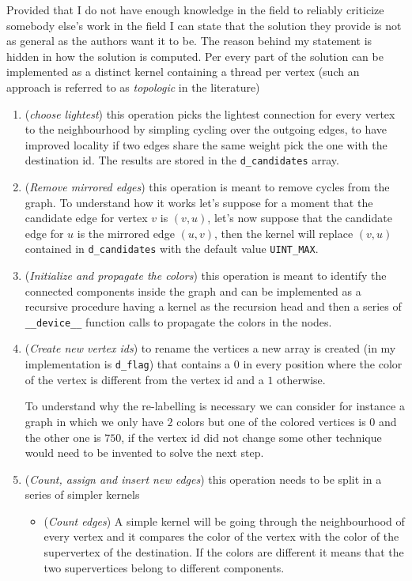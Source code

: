 \documentclass[a4paper,10pt]{article}
\begin{document}
Provided that I do not have enough knowledge in the field to reliably criticize somebody else's work
in the field I can state that the solution they provide is not as general as the authors want it to
be. The reason behind my statement is hidden in how the solution is computed. Per
\cite{generic-he-boruvka} every part of the solution can be implemented as a distinct kernel
containing a thread per vertex (such an approach is referred to as \textit{topologic} in the
literature)
\begin{enumerate}
	\item\label{item:choose-lightest} (\textit{choose lightest}) this operation picks the
		lightest connection for every vertex to the neighbourhood by simpling cycling over
		the outgoing edges, to have improved locality if two edges share the same weight pick the one with the destination id. The results are stored in the \texttt{d\_candidates} array.
	\item\label{item:mirror-removal} (\textit{Remove mirrored edges}) this operation is meant to
		remove cycles from the graph. To understand how it works let's suppose for a moment
		that the candidate edge for vertex $v$ is $(v, u)$, let's now suppose that the
		candidate edge for $u$ is the mirrored edge $(u, v)$, then the kernel will replace
		$(v, u)$ contained in \texttt{d\_candidates} with the default value
		\texttt{UINT\_MAX}.
	\item\label{item:coloration} (\textit{Initialize and propagate the colors}) this operation
		is meant to identify the connected components inside the graph and can be
		implemented as a recursive procedure having a kernel as the recursion head and then
		a series of \texttt{\_\_device\_\_} function calls to propagate the colors in the nodes.
	\item\label{item:vertex-rename} (\textit{Create new vertex ids}) to rename the vertices a
		new array is created (in my implementation is \texttt{d\_flag}) that contains a $0$
		in every position where the color of the vertex is different from the vertex id and
		a $1$ otherwise.
		
		To understand why the re-labelling is necessary we can consider for instance a graph
		in which we only have $2$ colors but one of the colored vertices is $0$ and the
		other one is $750$, if the vertex id did not change some other technique would need
		to be invented to solve the next step.
	\item\label{item:graph-contraction} (\textit{Count, assign and insert new edges}) this
		operation needs to be split in a series of simpler kernels
		\begin{itemize}
			\item\label{item:count-edges} (\textit{Count edges}) A simple kernel will be
				going through the neighbourhood of every vertex and it compares the
				color of the vertex with the color of the supervertex of the
				destination. If the colors are different it means that the two
				supervertices belong to different components.


\end{itemize}
\end{enumerate}
\end{document}
